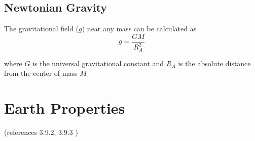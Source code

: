 \documentclass[
]{book}
\begin{document}
\hypertarget{newtonian-gravity}{%
\subsection*{Newtonian Gravity}\label{newtonian-gravity}}

The gravitational field (\(g\)) near any mass can be calculated as
\[ g = \frac{GM}{R_A^2} \]

where \(G\) is the universal gravitational constant and \(R_A\) is the absolute distance from the center of mass \(M\)

\hypertarget{earth-properties}{%
\section{Earth Properties}\label{earth-properties}}

(references 3.9.2, 3.9.3 )
\end{document}
